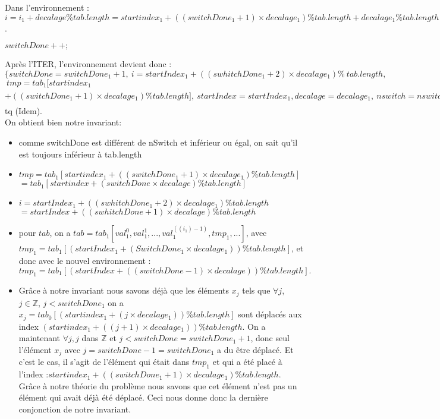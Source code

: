  Dans l'environnement : $i = i_{1} + decalage \% tab.length = startindex_{1} + ((switchDone_{1}+1)\times decalage_{1}) \% tab.length  + decalage_{1} \%tab.length = startIndex_{1} + ((swhitchDone_{1}+2)\times decalage_{1}) \%tab.length$.\\
 
\begin{center}
 $switchDone++;$\\
\end{center}
 
Après l'ITER, l'environnement devient donc : \\

\noindent$\{switchDone = switchDone_{1}+1,\ i = startIndex_{1} + ((swhitchDone_{1}+2)\times decalage_1) \%\ tab.length,$\\
$\ tmp = tab_{1}[startindex_{1}$ $+ ((switchDone_{1}+1)\times decalage_{1}) \% tab.length],\ startIndex = startIndex_{1}, decalage = decalage_{1},\ nswitch = nswitch_{1},\ tab = tab_{1}[val_{1}^{0},val_{1}^{1}, ..., val_{1}^{(i_{1}-1)}, tmp_{1}, ...,val_{1}^{tab.length-1}]\}$\\
tq (Idem).\\

On obtient bien notre invariant:
\begin{itemize}
	\item comme switchDone est différent de nSwitch et inférieur ou égal, on sait qu'il est toujours inférieur à tab.length
	\item $tmp = tab_{1}[startindex_{1} + ((switchDone_{1}+1)\times decalage_{1}) \% tab.length]$ 
		\subitem $= tab_{1}[startindex + (switchDone\times decalage) \% tab.length]$
	\item $i = startIndex_{1} + ((swhitchDone_{1}+2)\times decalage_{1}) \% tab.length $
		\subitem $= startIndex + ((swhitchDone+1)\times decalage) \%tab.length$
	\item pour $tab$, on a $tab = tab_{1}[val_{1}^{0},val_{1}^{1}, ..., val_{1}^{((i_{1})-1)}, tmp_{1}, ...]$, avec $tmp_{1} = tab_{1}[(startIndex_{1} + (SwitchDone_{1}\times decalage_{1})) \% tab.length]$, et donc avec le nouvel environnement : $tmp_{1} = tab_{1}[(startIndex + ((switchDone-1)\times decalage)) \% tab.length].$ 
	\item Grâce à notre invariant nous savons déjà que les éléments $x_{j}$ tels que $\forall j$, $j \in \mathbb{Z}$, $j<switchDone_{1}$ on a $x_{j}=tab_{0}[(startindex_{1} + (j\times decalage_{1})) \% tab.length]$ sont déplacés aux index $(startindex_{1} + ((j+1)\times decalage_{1}))\% tab.length$. On a maintenant $\forall j, j$ dans $\mathbb{Z}$ et $j<switchDone=switchDone_{1} + 1$, donc seul l'élément $x_{j}$ avec $j= switchDone - 1 = switchDone_{1}$ a du être déplacé. Et c'est le cas, il s'agit de l'élément qui était dans $tmp_{1}$ et qui a été placé à l'index :$ startindex_{1} + ((switchDone_{1}+1)\times decalage_{1}) \% tab.length$. Grâce à notre théorie du problème nous savons que cet élément n'est pas un élément qui avait déjà été déplacé. Ceci nous donne donc la dernière conjonction de notre invariant. \\
\end{itemize}

